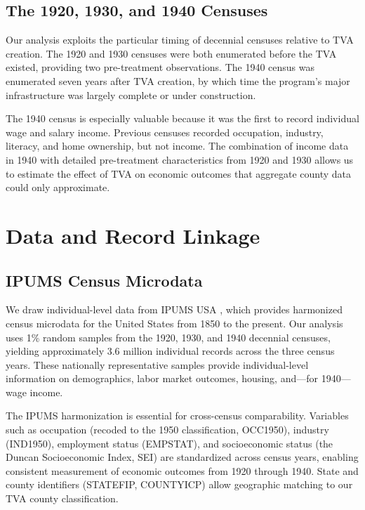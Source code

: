 \documentclass[12pt]{article}
\begin{document}
\subsection{The 1920, 1930, and 1940 Censuses}

Our analysis exploits the particular timing of decennial censuses relative to TVA creation. The 1920 and 1930 censuses were both enumerated before the TVA existed, providing two pre-treatment observations. The 1940 census was enumerated seven years after TVA creation, by which time the program's major infrastructure was largely complete or under construction.

The 1940 census is especially valuable because it was the first to record individual wage and salary income. Previous censuses recorded occupation, industry, literacy, and home ownership, but not income. The combination of income data in 1940 with detailed pre-treatment characteristics from 1920 and 1930 allows us to estimate the effect of TVA on economic outcomes that aggregate county data could only approximate.


\section{Data and Record Linkage}\label{sec:data}

\subsection{IPUMS Census Microdata}

We draw individual-level data from IPUMS USA \citep{ruggles2024}, which provides harmonized census microdata for the United States from 1850 to the present. Our analysis uses 1\% random samples from the 1920, 1930, and 1940 decennial censuses, yielding approximately 3.6 million individual records across the three census years. These nationally representative samples provide individual-level information on demographics, labor market outcomes, housing, and---for 1940---wage income.

The IPUMS harmonization is essential for cross-census comparability. Variables such as occupation (recoded to the 1950 classification, OCC1950), industry (IND1950), employment status (EMPSTAT), and socioeconomic status (the Duncan Socioeconomic Index, SEI) are standardized across census years, enabling consistent measurement of economic outcomes from 1920 through 1940. State and county identifiers (STATEFIP, COUNTYICP) allow geographic matching to our TVA county classification.
\end{document}
